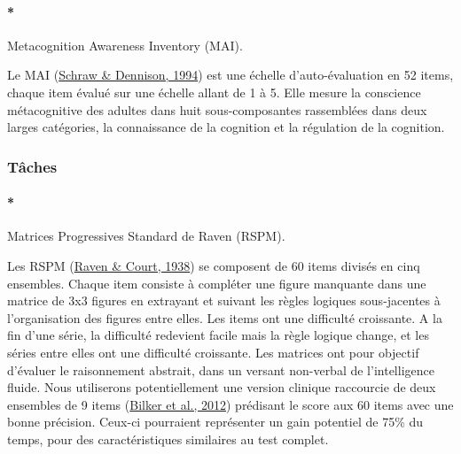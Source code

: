\documentclass[
  12pt,
]{article}
\let\oldparagraph\paragraph
\renewcommand{\paragraph}[1]{\oldparagraph{#1}\mbox{}}
\begin{document}
\hypertarget{metacognition-awareness-inventory-mai.}{%
\paragraph*{Metacognition Awareness Inventory
(MAI).}\label{metacognition-awareness-inventory-mai.}}

Le MAI
(\protect\hyperlink{ref-schrawAssessingMetacognitiveAwareness1994}{Schraw
\& Dennison, 1994}) est une échelle d'auto-évaluation en 52 items,
chaque item évalué sur une échelle allant de 1 à 5. Elle mesure la
conscience métacognitive des adultes dans huit sous-composantes
rassemblées dans deux larges catégories, la connaissance de la cognition
et la régulation de la cognition.

\hypertarget{tuxe2ches}{%
\subsubsection{Tâches}\label{tuxe2ches}}

\hypertarget{matrices-progressives-standard-de-raven-rspm.}{%
\paragraph*{Matrices Progressives Standard de Raven
(RSPM).}\label{matrices-progressives-standard-de-raven-rspm.}}

Les RSPM
(\protect\hyperlink{ref-ravenRavenProgressiveMatrices1938}{Raven \&
Court, 1938}) se composent de 60 items divisés en cinq ensembles. Chaque
item consiste à compléter une figure manquante dans une matrice de 3x3
figures en extrayant et suivant les règles logiques sous-jacentes à
l'organisation des figures entre elles. Les items ont une difficulté
croissante. A la fin d'une série, la difficulté redevient facile mais la
règle logique change, et les séries entre elles ont une difficulté
croissante. Les matrices ont pour objectif d'évaluer le raisonnement
abstrait, dans un versant non-verbal de l'intelligence fluide. Nous
utiliserons potentiellement une version clinique raccourcie de deux
ensembles de 9 items
(\protect\hyperlink{ref-bilkerDevelopmentAbbreviatedNineItem2012}{Bilker
et al., 2012}) prédisant le score aux 60 items avec une bonne précision.
Ceux-ci pourraient représenter un gain potentiel de 75\% du temps, pour
des caractéristiques similaires au test complet.
\end{document}
